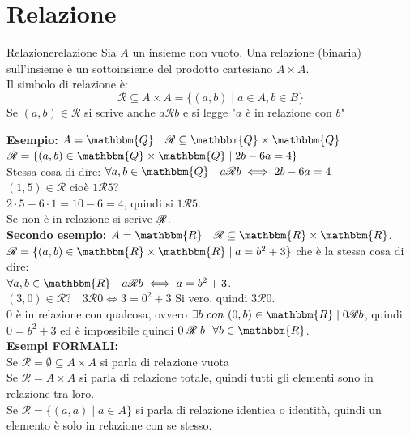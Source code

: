 \documentclass[12pt, letterpaper]{report}
\newcounter{definition}
\newcommand{\nmu}{}
\begin{document}
  		\chapter{Relazione}
  		\begin{definition}{\nmu Relazione}{relazione}
  			Sia $A$ un insieme non vuoto. Una relazione (binaria) sull'insieme è un sottoinsieme del prodotto cartesiano $A \times A$. \\
  			Il simbolo di relazione è:
  			\[
  			\mathscr{R} \subseteq A \times A = \{(a,b) \mid a \in A, b \in B\}
  			\]
  			Se $(a,b) \in \mathscr{R}$ si scrive anche $a\mathscr{R}b$ e si legge "$a$ è in relazione con $b$"
  		\end{definition}
  		\textbf{Esempio:} $A = \mathbbm{Q} \quad \mathscr{R} \subseteq \mathbbm{Q} \times \mathbbm{Q}$ \\
  		$\mathscr{R} = \{(a,b) \in \mathbbm{Q} \times \mathbbm{Q} \mid 2b-6a=4\}$ \\
  		Stessa cosa di dire: $\forall a,b \in \mathbbm{Q} \quad a\mathscr{R}b \iff 2b-6a=4$ \\
  		$(1,5) \in \mathscr{R}$ cioè $1\mathscr{R}5$? \\
  		$2 \cdot 5 - 6 \cdot 1 = 10 - 6 = 4$, quindi si $1\mathscr{R}5$. \\
  		Se non è in relazione si scrive $\centernot{\mathscr{R}}$.
  		\\
  		\textbf{Secondo esempio:} $A=\mathbbm{R} \quad \mathscr{R} \subseteq \mathbbm{R} \times \mathbbm{R}$. \\
  		$\mathscr{R} = \{(a,b) \in \mathbbm{R} \times \mathbbm{R} \mid a = b^2+3\}$ che è la stessa cosa di dire: \\
  		$\forall a,b \in \mathbbm{R} \quad a\mathscr{R}b \iff a=b^2+3$. \\
  		$(3,0) \in \mathscr{R}? \quad 3\mathscr{R}0 \iff 3 = 0^2+3$ Si vero, quindi $3\mathscr{R}0$. \\
  		0 è in relazione con qualcosa, ovvero $\exists b\ con\ (0,b)  \in \mathbbm{R} \mid 0\mathscr{R}b$, quindi \\ $0=b^2+3$ ed è impossibile quindi $0\centernot{\mathscr{R}}b\ \ \forall b \in \mathbbm{R}$. \\
  		\textbf{Esempi FORMALI: } \\
  		Se $\mathscr{R}=\emptyset \subseteq A \times A$ si parla di relazione vuota \\
  		Se $\mathscr{R}=A \times A$ si parla di relazione totale, quindi tutti gli elementi sono in relazione tra loro. \\
  		Se $\mathscr{R} = \{(a,a) \mid a \in A\}$ si parla di relazione identica o identità, quindi un elemento è solo in relazione con se stesso. \\
\end{document}
